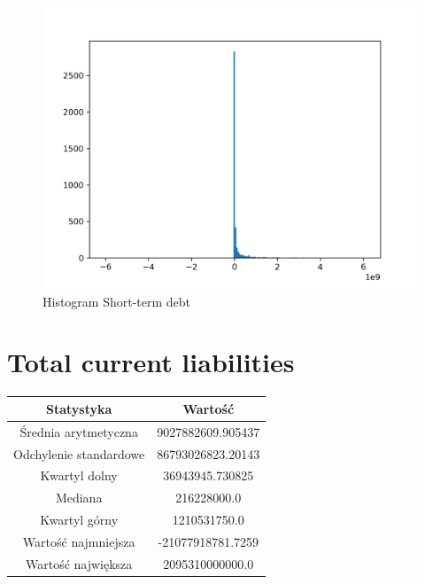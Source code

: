 \documentclass{article}
\begin{document}
\begin{figure}[h!]
    \includegraphics[width=\linewidth]{variables/Short-term debt.png}
    \caption{Histogram Short-term debt }
\end{figure}\section{ Total current liabilities }

\begin{center}
    \begin{tabular}{|c | c|} 
    \hline
    Statystyka & Wartość \\
    \hline\hline
    Średnia arytmetyczna & 9027882609.905437 \\ 
    \hline
    Odchylenie standardowe & 86793026823.20143 \\
    \hline
    Kwartyl dolny & 36943945.730825 \\
    \hline
    Mediana & 216228000.0 \\
    \hline
    Kwartyl górny & 1210531750.0 \\
    \hline
    Wartość najmniejsza & -21077918781.7259 \\
    \hline
    Wartość największa & 2095310000000.0 \\
    \hline
   \end{tabular}
\end{center}
\end{document}
